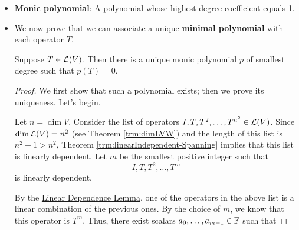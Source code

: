 \documentclass[../main.tex]{subfiles}
\begin{document}
\begin{itemize}
\begin{theorem}
        Suppose $V$ is a complex vector space and $T\in\ope{V}$. Let $q$ denote the characteristic polynomial of $T$. Then $q(T)=0$.
        \begin{proof}
            Let $\lambda_1,\dots,\lambda_m$ be the distinct eigenvalues of $T$. To prove that $q(T)=0$, it will suffice to show that $q(T)v=0$ for all $v\in V$. Let $v\in V$ be arbitrary. Then by Theorem \ref{trm:genEigenDecompa}, $v=u_1+\cdots+u_m$ where each $u_j\in G(\lambda_j,T)$. Additionally, Theorems \ref{trm:genEigenDecompc} and \ref{trm:NtothedimV} assert that each $(T-\lambda_jI)^{d_j}|_{G(\lambda_j,T)}=0$. Therefore, we have that
            \begin{equation*}
                q(T)v = \prod_{i=1}^m(T-\lambda_iI)^{d_i}(u_1+\cdots+u_m) = 0
            \end{equation*}
            since after distributing the operator to each term in the sum, we can restrict the domain of each exponential to $G(\lambda_j,T)$ and commute the $(T-\lambda_jI)^{d_j}|_{G(\lambda_j,T)}$ term to be applied first (by Theorem \ref{trm:polTMultiplicative}).
        \end{proof}
    \end{theorem}
    \item \textbf{Monic polynomial}: A polynomial whose highest-degree coefficient equals 1.
    \item We now prove that we can associate a unique \textbf{minimal polynomial} with each operator $T$.
    \begin{theorem}\label{trm:minPolynomial}
        Suppose $T\in\ope{V}$. Then there is a unique monic polynomial $p$ of smallest degree such that $p(T)=0$.
        \begin{proof}
            We first show that such a polynomial exists; then we prove its uniqueness. Let's begin.\par
            Let $n=\dim V$. Consider the list of operators $I,T,T^2,\dots,T^{n^2}\in\mathcal{L}(V)$. Since $\dim\mathcal{L}(V)=n^2$ (see Theorem \ref{trm:dimLVW}) and the length of this list is $n^2+1>n^2$, Theorem \ref{trm:linearIndependent-Spanning} implies that this list is linearly dependent. Let $m$ be the smallest positive integer such that
            \begin{equation*}
                I,T,T^2,\dots,T^m
            \end{equation*}
            is linearly dependent.\par
            By the \hyperref[lem:linearDependenceLemma]{Linear Dependence Lemma}, one of the operators in the above list is a linear combination of the previous ones. By the choice of $m$, we know that this operator is $T^m$. Thus, there exist scalars $a_0,\dots,a_{m-1}\in\mathbb{F}$ such that

\end{proof}
\end{theorem}
\end{itemize}
\end{document}
